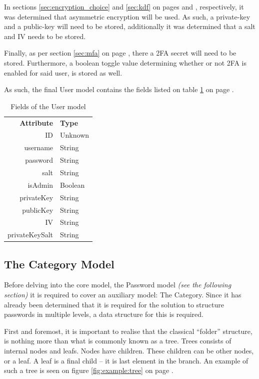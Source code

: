 			In sections \ref{sec:encryption_choice} and \ref{sec:kdf} on pages \pageref{sec:encryption_choice} and \pageref{sec:kdf}, respectively, it was determined that asymmetric encryption will be used. As such, a private-key and a public-key will need to be stored, additionally it was determined that a salt and IV needs to be stored. 

			Finally, as per section \ref{sec:mfa} on page \pageref{sec:mfa}, there a 2FA secret will need to be stored. Furthermore, a boolean toggle value determining whether or not 2FA is enabled for said user, is stored as well.

			As such, the final User model contains the fields listed on table \ref{fig:model:user} on page \pageref{fig:model:user}.

			\begin{table}[p]
				\centering
				\begin{tabular}{r|l}
					\textbf{Attribute} 		& \textbf{Type} 		\\
					ID 						& Unknown 	\\
					username 				& String 	\\
					password 				& String 	\\
					salt 					& String 	\\
					isAdmin 				& Boolean 	\\
					privateKey  			& String 	\\
					publicKey 				& String 	\\
					IV 						& String 	\\
					privateKeySalt 			& String 	\\
				\end{tabular}
				\caption{Fields of the User model}
				\label{fig:model:user}
			\end{table}

		\subsection{The Category Model}
			\label{sec:model:category}
			Before delving into the core model, the Password model \emph{(see the following section)} it is required to cover an auxiliary model: The Category. Since it has already been determined that it is required for the solution to structure passwords in multiple levels, a data structure for this is required.

			First and foremost, it is important to realise that the classical ``folder'' structure, is nothing more than what is commonly known as a tree. Trees consists of internal nodes and leafs. Nodes have children. These children can be other nodes, or a leaf. A leaf is a final child -- it is last element in the branch. An example of such a tree is seen on figure \ref{fig:example:tree} on page \pageref{fig:example:tree}.


